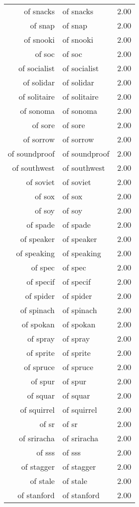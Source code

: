 \begin{table}[ht]
\begin{tabular}{rlr}
  of snacks & of snacks & 2.00 \\ 
  of snap & of snap & 2.00 \\ 
  of snooki & of snooki & 2.00 \\ 
  of soc & of soc & 2.00 \\ 
  of socialist & of socialist & 2.00 \\ 
  of solidar & of solidar & 2.00 \\ 
  of solitaire & of solitaire & 2.00 \\ 
  of sonoma & of sonoma & 2.00 \\ 
  of sore & of sore & 2.00 \\ 
  of sorrow & of sorrow & 2.00 \\ 
  of soundproof & of soundproof & 2.00 \\ 
  of southwest & of southwest & 2.00 \\ 
  of soviet & of soviet & 2.00 \\ 
  of sox & of sox & 2.00 \\ 
  of soy & of soy & 2.00 \\ 
  of spade & of spade & 2.00 \\ 
  of speaker & of speaker & 2.00 \\ 
  of speaking & of speaking & 2.00 \\ 
  of spec & of spec & 2.00 \\ 
  of specif & of specif & 2.00 \\ 
  of spider & of spider & 2.00 \\ 
  of spinach & of spinach & 2.00 \\ 
  of spokan & of spokan & 2.00 \\ 
  of spray & of spray & 2.00 \\ 
  of sprite & of sprite & 2.00 \\ 
  of spruce & of spruce & 2.00 \\ 
  of spur & of spur & 2.00 \\ 
  of squar & of squar & 2.00 \\ 
  of squirrel & of squirrel & 2.00 \\ 
  of sr & of sr & 2.00 \\ 
  of sriracha & of sriracha & 2.00 \\ 
  of sss & of sss & 2.00 \\ 
  of stagger & of stagger & 2.00 \\ 
  of stale & of stale & 2.00 \\ 
  of stanford & of stanford & 2.00 \\ 

\end{tabular}
\end{table}

